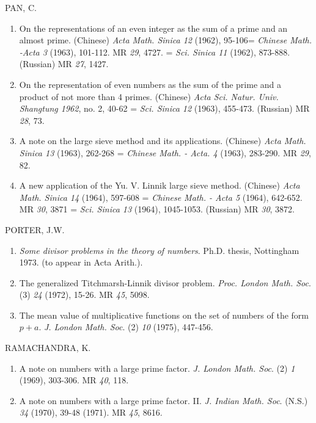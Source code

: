 \begin{thebibliography}{99}
 PAN, C.
\begin{enumerate}
\item On the representations of an even integer as the sum of a prime
  and an almost prime. (Chinese) \textit{Acta Math. Sinica 12} (1962),
  95-106= \textit{Chinese Math. -Acta 3} (1963), 101-112. MR {\em 29},
  4727. = \textit{Sci. Sinica 11} (1962), 873-888. (Russian) MR {\em
    27}, 1427.

\item On the representation of even numbers as the sum of the prime
  and a product of not more than 4 primes. (Chinese) \textit{Acta
    Sci. Natur. Univ. Shangtung 1962}, no. 2, 40-62 =
  \textit{Sci. Sinica 12} (1963), 455-473. (Russian) MR {\em 28}, 73.

\item A note on the large sieve method and its applications. (Chinese)
  \textit{Acta Math. Sinica 13} (1963), 262-268 = \textit{Chinese
    Math. - Acta. 4} (1963), 283-290. MR {\em 29}, 82. 

\item A new application of the Yu. V. Linnik large sieve
  method. (Chinese) \textit{Acta Math. Sinica 14} (1964), 597-608 =
  \textit{Chinese Math. - Acta 5} (1964), 642-652. MR
  {\em 30}, 3871 = \textit{Sci. Sinica 13} (1964), 1045-1053. (Russian) MR
  {\em 30}, 3872. 
\end{enumerate}

 PORTER, J.W.
\begin{enumerate}
\item \textit{Some divisor problems in the theory of
  numbers}. Ph.D. thesis, Nottingham 1973. (to appear in Acta Arith.).

\item The generalized Titchmarsh-Linnik divisor problem. 
\textit{Proc. London Math. Soc}. (3) {\em 24} (1972), 15-26. MR {\em
  45}, 5098.

\item The mean value of multiplicative functions on the set of numbers
  of the form $p+a$. \textit{J. London Math. Soc}. (2) {\em 10}
  (1975), 447-456. 
\end{enumerate}

 RAMACHANDRA, K.
\begin{enumerate}
\item A note on numbers with a large prime factor. \textit{J. London
  Math. Soc}. (2) {\em 1} (1969), 303-306. MR {\em 40}, 118.

\item A note on numbers with a large prime
  factor. II. \textit{J. Indian Math. Soc}. (N.S.) {\em 34}
  (1970), 39-48 (1971). MR {\em 45}, 8616. 


\end{enumerate}
\end{thebibliography}
